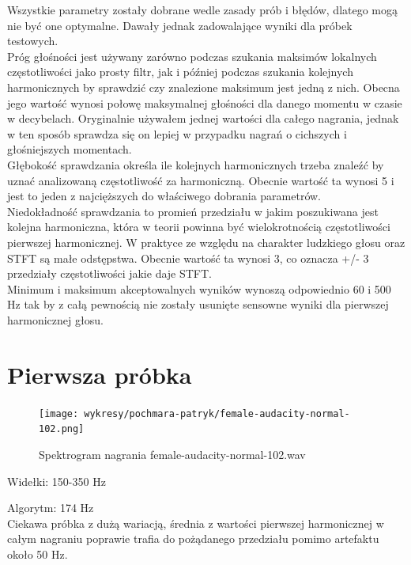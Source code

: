 \documentclass[a4paper,12pt]{extarticle}
\begin{document}
\noindent Wszystkie parametry zostały dobrane wedle zasady prób i błędów, dlatego mogą nie być one optymalne. Dawały jednak zadowalające wyniki dla próbek testowych.\\

\noindent Próg głośności jest używany zarówno podczas szukania maksimów lokalnych częstotliwości jako prosty filtr, jak i później podczas szukania kolejnych harmonicznych by sprawdzić czy znalezione maksimum jest jedną z nich. Obecna jego wartość wynosi połowę maksymalnej głośności dla danego momentu w czasie w decybelach. Oryginalnie używałem jednej wartości dla całego nagrania, jednak w ten sposób sprawdza się on lepiej w przypadku nagrań  o cichszych i głośniejszych momentach.\\

\noindent Głębokość sprawdzania określa ile kolejnych harmonicznych trzeba znaleźć by uznać analizowaną częstotliwość za harmoniczną. Obecnie wartość ta wynosi 5 i jest to jeden z najcięższych do właściwego dobrania parametrów.\\

\noindent Niedokładność sprawdzania to promień przedziału w jakim poszukiwana jest kolejna harmoniczna, która w teorii powinna być wielokrotnością częstotliwości pierwszej harmonicznej. W praktyce ze względu na charakter ludzkiego głosu oraz STFT są małe odstępstwa. Obecnie wartość ta wynosi 3, co oznacza +/- 3 przedziały częstotliwości jakie daje STFT.\\

\noindent Minimum i maksimum akceptowalnych wyników wynoszą odpowiednio 60 i 500 Hz tak by z całą pewnością nie zostały usunięte sensowne wyniki dla pierwszej harmonicznej głosu.

\newpage

\section*{Pierwsza próbka}

\begin{figure}[h!]
\centering
\texttt{[image: wykresy/pochmara-patryk/female-audacity-normal-102.png]}
\caption{Spektrogram nagrania female-audacity-normal-102.wav}
\end{figure}

\noindent Widełki: 150-350 Hz

\noindent Algorytm: 174 Hz\\

\noindent Ciekawa próbka z dużą wariacją, średnia  z wartości pierwszej harmonicznej w całym nagraniu poprawie trafia do pożądanego przedziału pomimo artefaktu około 50 Hz.
\end{document}
